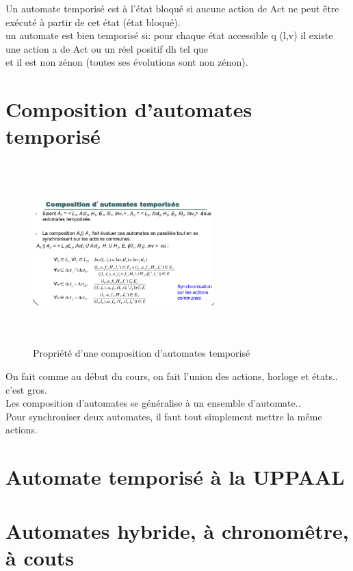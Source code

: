 \documentclass[oneside]{book}
\begin{document}
    Un automate temporisé est à l'état bloqué si aucune action de Act ne peut être exécuté à partir de cet état (état bloqué).\\
    
    un automate est bien temporisé si: pour chaque état accessible q (l,v) il existe une action a de Act ou un réel positif dh tel que \\
    
    et il est non zénon (toutes ses évolutions sont non zénon).
    \section{Composition d'automates temporisé}
    
    \begin{figure}[!ht]
    	\centering
    	\includegraphics[width = 7cm, height = 7cm, keepaspectratio]{Images/composition_automate_temporise.png}
    	\caption{Propriété d'une composition d'automates temporisé}
    	\label{fig:CompositionAutomateTemporise}
    \end{figure}
    
    On fait comme au début du cours, on fait l'union des actions, horloge et états.. c'est gros.\\
    
    Les composition d'automates se généralise à un ensemble  d'automate..\\
    
    Pour synchroniser deux automates, il faut tout simplement mettre la même actions.\\
    
    
    \section{Automate temporisé à la UPPAAL}
    \section{Automates hybride, à chronomêtre, à couts}
    
\end{document}
